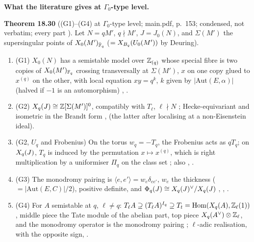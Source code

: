 \medskip\noindent\textbf{What the literature gives at $\Gamma_0$-type level.}\par
\noindent{}\label{rpt:thm:s05-G}\textbf{Theorem 18.30} ((G1)--(G4) at $\Gamma_0$-type level; main.pdf, p.~153; condensed, not verbatim; every part \stcited).
Let $N=qM'$, $q\nmid M'$, $J=J_0(N)$, and $\Sigma(M')$ the supersingular points of $X_0(M')_{\bar{\mathbb{F}}_q}$ ($=X_{B_q}(U_0(M'))$ by Deuring).
\begin{enumerate}[label=(\roman*)]
\item (G1) $X_0(N)$ has a semistable model over $\mathbb{Z}_{(q)}$ whose special fibre is two copies of $X_0(M')_{\mathbb{F}_q}$ crossing transversally at
  $\Sigma(M')$, $x$ on one copy glued to $x^{(q)}$ on the other, with local equation $xy=q^k$, $k$ given by $|\mathrm{Aut}(E,\alpha)|$ (halved if
  $-1$ is an automorphism) \cite[Ch.~V, Thm.~1.16, Var.~1.18; Ch.~VI, Thm.~6.9]{DR}, \cite[\S3, p.~439]{Ri90}.
\item (G2) $X_q(J)\cong\mathbb{Z}[\Sigma(M')]^0$, compatibly with $T_\ell$, $\ell\nmid N$ \cite[Prop.~3.1, p.~439]{Ri90}; Hecke-equivariant and isometric in
  the Brandt form \cite[Thm.~4.3, p.~11]{Koh01}, \cite[Prop.~6.5]{PW} (the latter after localising at a non-Eisenstein ideal).
\item (G2, $U_q$ and Frobenius) On the torus $w_q=-T_q$, the Frobenius acts as $qT_q$; on $X_q(J)$, $T_q$ is induced by the permutation
  $x\mapsto x^{(q)}$, which is right multiplication by a uniformiser $\Pi_q$ on the class set \cite[Prop.~3.7, 3.8, Rem.~3.5(b)]{Ri90};
  also \cite[Lemma~3.17]{RS}, \cite[Appendix, Thm.~(A.1)(a)]{Mz}.
\item (G3) The monodromy pairing is $\langle e,e'\rangle=w_e\delta_{ee'}$, $w_e$ the thickness ($=|\mathrm{Aut}(E,C)|/2$), positive definite, and
  $\Phi_q(J)\cong X_q(J)^\vee/X_q(J)$ \cite[Raynaud, Thm.~5, p.~17]{Ast196}, \cite[\S4.2, Thm.~4.1]{Koh01}, \cite[Exp.~IX, Thm.~11.5]{SGA7}.
\item (G4) For $A$ semistable at $q$, $\ell\ne q$: $T_\ell A\supseteq(T_\ell A)^{I_q}\supseteq T_t=\operatorname{Hom}(X_q(A),\mathbb{Z}_\ell(1))$, middle piece the Tate
  module of the abelian part, top piece $X_q(A^\vee)\otimes\mathbb{Z}_\ell$, and the monodromy operator is the monodromy pairing
  \cite[Exp.~IX, 2.4, 9.1--10.4]{SGA7}; $\ell$-adic realisation, with the opposite sign, \cite[Thm.~2.7, p.~41]{Ill}.
\end{enumerate}
\medskip
